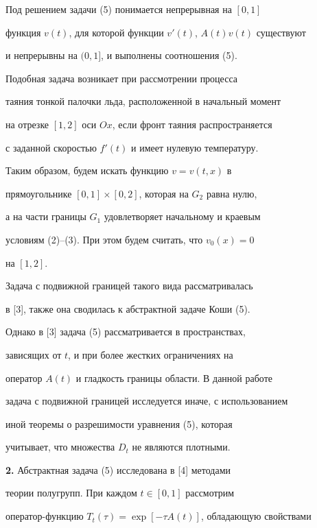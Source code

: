 Под решением задачи (5) понимается непрерывная на $[0,1]$


функция $v(t)$, для которой функции $v'(t)$, $A(t)v(t)$ существуют


и непрерывны на $(0,1]$, и выполнены соотношения (5).





Подобная задача возникает при рассмотрении процесса


таяния тонкой палочки льда, расположенной в начальный момент


на отрезке $[1,2]$ оси $Ox$, если фронт таяния распространяется


с заданной скоростью $f'(t)$ и имеет нулевую температуру.





Таким образом, будем искать функцию $v=v(t,x)$ в


прямоугольнике $[0,1]\times[0,2]$, которая на $G_2$ равна нулю,


а на части границы $G_1$ удовлетворяет начальному и краевым


условиям (2)--(3). При этом будем считать, что $v_0(x)=0$


на $[1,2]$.





Задача с подвижной границей такого вида рассматривалась


в [3], также она сводилась к абстрактной задаче Коши (5).


Однако в [3] задача (5) рассматривается в пространствах,


зависящих от $t$, и при более жестких ограничениях на


оператор $A(t)$ и гладкость границы области. В данной работе


задача с подвижной границей исследуется иначе, с использованием


иной теоремы о разрешимости уравнения (5), которая


учитывает, что множества $D_t$ не являются плотными.


\medskip





{\bf 2.} Абстрактная задача (5) исследована в [4] методами


теории полугрупп. При каждом $t\in[0,1]$ рассмотрим


оператор-функцию $T_t(\tau)=\exp[-\tau A(t)]$, обладающую свойствами





